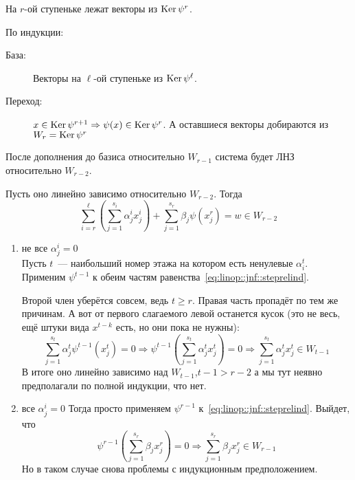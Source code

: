 \documentclass[12pt]{../../../notes}
\begin{document}
\begin{lem}\label{lem:linop::jnf::stairscont}
  На $r$-ой ступеньке лежат векторы из $\operatorname{Ker} \psi^r$. 
\end{lem}
\begin{itlproof}
  По индукции:
  \begin{description}
    \item[База:] Векторы на $\ell$-ой ступеньке из $\operatorname{Ker} \psi^\ell$.
    \item[Переход:] $x\in \operatorname{Ker} \psi^{r+1} \Rightarrow \psi(x) \in \operatorname{Ker} \psi^{r}$. А оставшиеся векторы добираются из
      $W_r = \operatorname{Ker} \psi^r$
  \end{description}
\end{itlproof}

\begin{lem}\label{lem:linop::jnf::corralg}
  После дополнения до базиса относительно $W_{r-1}$ система будет ЛНЗ относительно $W_{r-2}$.
\end{lem}

\begin{itlproof}
  Пусть оно линейно зависимо относительно $W_{r-2}$. Тогда 
  \begin{equation}
    \sum_{i=r}^{\ell} \left( \sum_{j=1}^{s_i} \alpha_j^i x_j^i \right) + \sum_{j=1}^{s_r} \beta_j \psi(x^{r}_j) = w \in W_{r-2}
    \label{eq:linop::jnf::steprelind}
  \end{equation}
  \begin{enumerate}[1)]
    \item не все $\alpha_j^i = 0$ \\
      Пусть $t$~--- наибольший номер этажа на котором есть ненулевые $\alpha_i^t$. Применим $\psi^{t-1}$ к обеим частям
      равенства~\eqref{eq:linop::jnf::steprelind}.
      
      Второй член уберётся совсем, ведь $t \geqslant r$. Правая часть пропадёт по тем же причинам. 
      А вот от первого слагаемого левой останется кусок (это не весь, ещё штуки вида $x^{t-k}$ есть, но они пока не нужны):
      \[
        \sum_{j=1}^{s_t} \alpha_j^t \psi^{t-1}(x_j^t)= 0 \Rightarrow \psi^{t-1} \left( \sum_{j=1}^{s_t} \alpha_j^t x_j^t \right) = 0
        \Rightarrow \sum_{j=1}^{s_t} \alpha_j^t x_j^t \in W_{t-1}
      \]
      В итоге оно линейно зависимо над $W_{t-1}$,$t-1 > r-2$ а мы тут неявно предполагали по полной индукции, что нет.
    \item все $\alpha_j^i = 0$ 
      Тогда просто применяем $\psi^{r-1}$ к~\eqref{eq:linop::jnf::steprelind}. Выйдет, что
      \[
        \psi^{r-1}\left( \sum_{j=1}^{s_r} \beta_j x_j^r \right) = 0 \Rightarrow \sum_{j=1}^{s_r} \beta_j x_j^r \in W_{r-1}
      \]
      Но в таком случае снова проблемы с индукционным предположением.
  \end{enumerate}
\end{itlproof}
\end{document}
